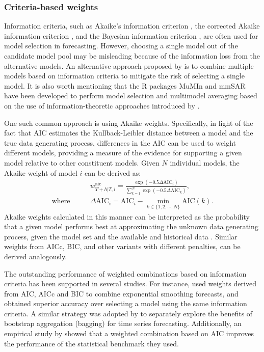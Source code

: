 \documentclass[a4paper,11pt]{article}
\newcommand{\pkg}[1]{{\normalfont\fontseries{b}\selectfont #1}}
\let\proglang=\textsf
\begin{document}
\subsubsection*{Criteria-based weights}

Information criteria, such as Akaike's information criterion \citep[AIC,][]{Akaike1974-ya}, the corrected Akaike information criterion \citep[AICc,][]{Sugiura1978-xm}, and the Bayesian information criterion \citep[BIC,][]{Schwarz1978-cz}, are often used for model selection in forecasting. However, choosing a single model out of the candidate model pool may be misleading because of the information loss from the alternative models. An alternative approach proposed by \citet{Burnham2002-us} is to combine multiple models based on information criteria to mitigate the risk of selecting a single model. It is also worth mentioning that the \proglang{R} packages \pkg{MuMIn} \citep{rMuMIn} and \pkg{mmSAR} \citep{rmmSAR} have been developed to perform model selection and multimodel averaging based on the use of information-theoretic approaches introduced by \citet{Burnham2002-us}.

One such common approach is using Akaike weights. Specifically, in light of the fact that AIC estimates the Kullback-Leibler distance \citep{Kullback1951-hl} between a model and the true data generating process, differences in the AIC can be used to weight different models, providing a measure of the evidence for supporting a given model relative to other constituent models. Given $N$ individual models, the Akaike weight of model $i$ can be derived as:
\begin{align*}
    & w_{T+h|T, i}^{\text{aic}}=\frac{\exp (-0.5 \Delta \mathrm{AIC}_{i})}{\sum_{k=1}^{N} \exp \left(-0.5 \Delta \mathrm{AIC}_{k}\right)}, \\
  \text{where}\qquad
    & \Delta \mathrm{AIC}_{i}=\mathrm{AIC}_{i}-\min _{k \in \{1,2,\cdots,N\}} \mathrm{AIC}(k).
\end{align*}
Akaike weights calculated in this manner can be interpreted as the probability that a given model performs best at approximating the unknown data generating process, given the model set and the available and historical data \citep{Kolassa2011-ai}. Similar weights from AICc, BIC, and other variants with different penalties, can be derived analogously.

The outstanding performance of weighted combinations based on information criteria has been supported in several studies. For instance, \citet{Kolassa2011-ai} used weights derived from AIC, AICc and BIC to combine exponential smoothing forecasts, and obtained superior accuracy over selecting a model using the same information criteria. A similar strategy was adopted by \citet{Petropoulos2018-fw} to separately explore the benefits of bootstrap aggregation (bagging) for time series forecasting. Additionally, an empirical study by \citet{Petropoulos2018-ad} showed that a weighted combination based on AIC improves the performance of the statistical benchmark they used.
\end{document}

